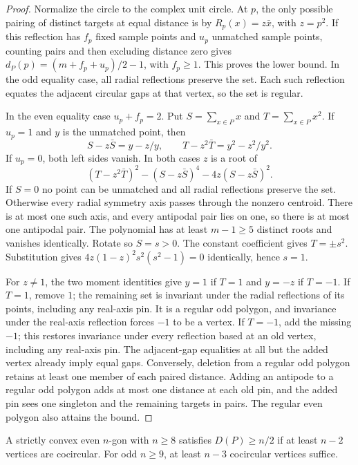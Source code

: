\begin{proof}
Normalize the circle to the complex unit circle. At \(p\), the only possible pairing of distinct targets at equal distance is by \(R_p(x)=z\bar x\), with \(z=p^2\). If this reflection has \(f_p\) fixed sample points and \(u_p\) unmatched sample points, counting pairs and then excluding distance zero gives \(d_P(p)=(m+f_p+u_p)/2-1\), with \(f_p\ge1\). This proves the lower bound. In the odd equality case, all radial reflections preserve the set. Each such reflection equates the adjacent circular gaps at that vertex, so the set is regular.

In the even equality case \(u_p+f_p=2\). Put \(S=\sum_{x\in P}x\) and \(T=\sum_{x\in P}x^2\). If \(u_p=1\) and \(y\) is the unmatched point, then
\[
 S-z\bar S=y-z/y,\qquad
 T-z^2\bar T=y^2-z^2/y^2.
\]
If \(u_p=0\), both left sides vanish. In both cases \(z\) is a root of
\[
 (T-z^2\bar T)^2-(S-z\bar S)^4-4z(S-z\bar S)^2.
\]
If \(S=0\) no point can be unmatched and all radial reflections preserve the set. Otherwise every radial symmetry axis passes through the nonzero centroid. There is at most one such axis, and every antipodal pair lies on one, so there is at most one antipodal pair. The polynomial has at least \(m-1\ge5\) distinct roots and vanishes identically. Rotate so \(S=s>0\). The constant coefficient gives \(T=\pm s^2\). Substitution gives \(4z(1-z)^2s^2(s^2-1)=0\) identically, hence \(s=1\).

For \(z\ne1\), the two moment identities give \(y=1\) if \(T=1\) and \(y=-z\) if \(T=-1\). If \(T=1\), remove \(1\); the remaining set is invariant under the radial reflections of its points, including any real-axis pin. It is a regular odd polygon, and invariance under the real-axis reflection forces \(-1\) to be a vertex. If \(T=-1\), add the missing \(-1\); this restores invariance under every reflection based at an old vertex, including any real-axis pin. The adjacent-gap equalities at all but the added vertex already imply equal gaps. Conversely, deletion from a regular odd polygon retains at least one member of each paired distance. Adding an antipode to a regular odd polygon adds at most one distance at each old pin, and the added pin sees one singleton and the remaining targets in pairs. The regular even polygon also attains the bound.
\end{proof}

\begin{theorem}[982-C04, 982-C05]
A strictly convex even \(n\)-gon with \(n\ge8\) satisfies \(D(P)\ge n/2\) if at least \(n-2\) vertices are cocircular. For odd \(n\ge9\), at least \(n-3\) cocircular vertices suffice.
\end{theorem}

